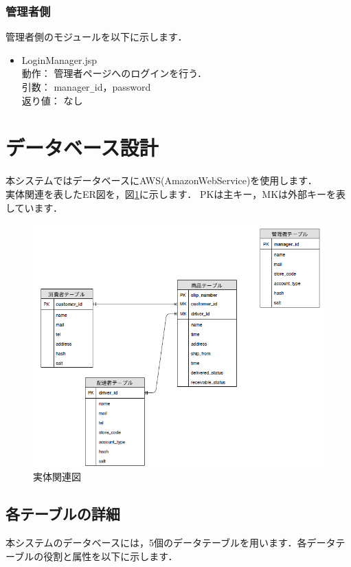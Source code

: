 \documentclass[a4j,titlepage]{jarticle}
\begin{document}
\subsubsection{管理者側}
管理者側のモジュールを以下に示します．
\begin{itemize}
\item LoginManager.jsp\\
  動作： 管理者ページへのログインを行う．\\
  引数： manager\verb|_|id，password\\
  返り値： なし
\end{itemize}


\section{データベース設計}
本システムではデータベースにAWS(AmazonWebService)を使用します．\\
実体関連を表したER図を，図\ref{fig:erd}に示します．
PKは主キー，MKは外部キーを表しています．
\begin{figure}[H]
 \begin{center}
  \includegraphics[width=150mm]{erd.png}
  \caption{実体関連図}
  \label{fig:erd}
 \end{center}
\end{figure}
 
\subsection{各テーブルの詳細}
本システムのデータベースには，5個のデータテーブルを用います．各データテーブルの役割と属性を以下に示します．
\end{document}
